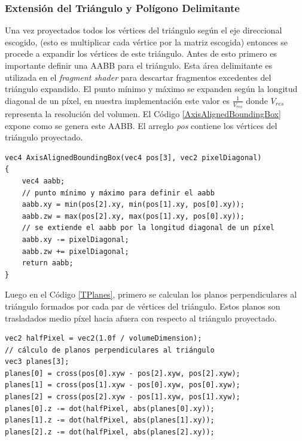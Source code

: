 \subsubsection{Extensión del Triángulo y Polígono Delimitante}
Una vez proyectados todos los vértices del triángulo según el eje direccional escogido, (esto es multiplicar cada vértice por la matriz escogida) entonces se procede a expandir los vértices de este triángulo. Antes de esto primero es importante definir una \ac{AABB} para el triángulo. Esta área delimitante es utilizada en el \emph{fragment shader} para descartar fragmentos excedentes del triángulo expandido. El punto mínimo y máximo se expanden según la longitud diagonal de un píxel, en nuestra implementación este valor es $\frac{1}{V_{res}}$ donde $V_{res}$ representa la resolución del volumen. El Código \ref{AxisAlignedBoundingBox} expone como se genera este \ac{AABB}.  El arreglo \emph{pos} contiene los vértices del triángulo proyectado.
\\
\begin{lstlisting}[caption={Creación de un \ac{AABB} para el triángulo proyectado.}, label=AxisAlignedBoundingBox]
vec4 AxisAlignedBoundingBox(vec4 pos[3], vec2 pixelDiagonal)
{
    vec4 aabb;
    // punto mínimo y máximo para definir el aabb
    aabb.xy = min(pos[2].xy, min(pos[1].xy, pos[0].xy));
    aabb.zw = max(pos[2].xy, max(pos[1].xy, pos[0].xy));
    // se extiende el aabb por la longitud diagonal de un píxel
    aabb.xy -= pixelDiagonal;
    aabb.zw += pixelDiagonal;
    return aabb;
}
\end{lstlisting}

Luego en el Código \ref{TPlanes}, primero se calculan los planos perpendiculares al triángulo formados por cada par de vértices del triángulo. Estos planos son trasladados medio píxel hacia afuera con respecto al triángulo proyectado.
\\
\begin{lstlisting}[caption={Planos por cada par de vértices del triángulo proyectado.}, label=TPlanes]
vec2 halfPixel = vec2(1.0f / volumeDimension);
// cálculo de planos perpendiculares al triángulo
vec3 planes[3];
planes[0] = cross(pos[0].xyw - pos[2].xyw, pos[2].xyw);
planes[1] = cross(pos[1].xyw - pos[0].xyw, pos[0].xyw);
planes[2] = cross(pos[2].xyw - pos[1].xyw, pos[1].xyw);
planes[0].z -= dot(halfPixel, abs(planes[0].xy));
planes[1].z -= dot(halfPixel, abs(planes[1].xy));
planes[2].z -= dot(halfPixel, abs(planes[2].xy));
\end{lstlisting}

